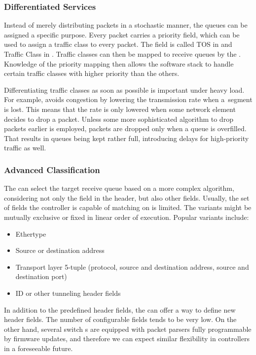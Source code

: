 \subsubsection{Differentiated Services}

Instead of merely distributing packets in a stochastic manner, the queues can be
assigned a specific purpose. Every  packet carries a priority field,
which can be used to assign a traffic class to every packet. The field is called
\acrfull{TOS} in  and Traffic Class in . Traffic classes can
then be mapped to receive queues by the . Knowledge of the priority
mapping then allows the software stack to handle certain traffic classes with higher
priority than the others.

Differentiating traffic classes as soon as possible is important under heavy load. For
example,  avoids congestion by lowering the transmission rate when a~segment is lost.
This means that the rate is only lowered when some network element decides to drop
a packet. Unless some more sophisticated algorithm to drop packets earlier is
employed, packets are dropped only when a queue is overfilled. That results in
queues being kept rather full, introducing delays for high-priority traffic as
well.

\subsubsection{Advanced Classification}
\label{offload:classification}

The  can select the target receive queue based on a more complex
algorithm, considering not only the  field in the  header, but
also other fields. Usually, the set of fields the controller is capable of
matching on is limited. The variants might be mutually exclusive or fixed in
linear order of execution. Popular variants include:

\begin{itemize}
	\item Ethertype
	\item Source or destination  address
	\item Transport layer 5-tuple (protocol, source and destination address,
	      source and destination port)
	\item {} ID or other tunneling header fields
\end{itemize}

In addition to the predefined header fields, the  can offer a way to define
new header fields. The number of configurable fields tends to be very low. On the
other hand, several switch s are equipped with packet parsers fully
programmable by firmware updates, and therefore we can expect similar
flexibility in  controllers in a foreseeable future.

